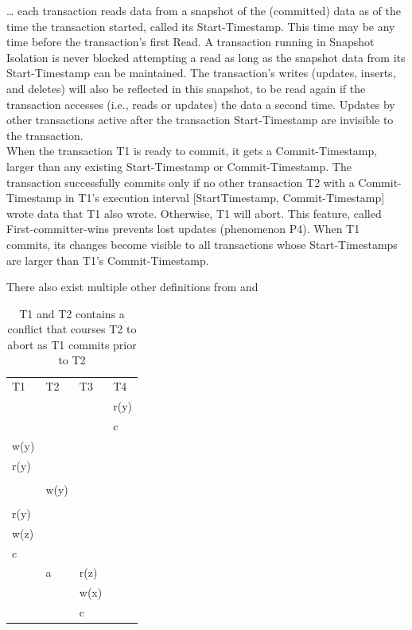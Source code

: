 \documentclass[a4paper,10pt,titlepage]{report}
\begin{document}
\begin{displayquote}
… each transaction reads data from a snapshot of the (committed) data as of the time the transaction started, called its Start-Timestamp. This time may be any time before the transaction's first Read. A transaction running in Snapshot Isolation is never blocked attempting a read as long as the snapshot data from its Start-Timestamp can be maintained. The transaction's writes (updates, inserts, and deletes) will also be reflected in this snapshot, to be read again if the transaction accesses (i.e., reads or updates) the data a second time. Updates by other transactions active after the transaction Start-Timestamp are invisible to the transaction.
\\
When the transaction T1 is ready to commit, it gets a Commit-Timestamp, larger than any existing Start-Timestamp or Commit-Timestamp. The transaction successfully commits only if no other transaction T2 with a Commit-Timestamp in T1's execution interval [StartTimestamp, Commit-Timestamp] wrote data that T1 also wrote. Otherwise, T1 will abort. This feature, called First-committer-wins prevents lost updates (phenomenon P4). When T1 commits, its changes become visible to all transactions whose Start-Timestamps are larger than T1's Commit-Timestamp.
\end{displayquote}


There also exist multiple other definitions from \cite{CeroneBernardiGotsman} and \cite{CrooksPuAlvisiClement}


\begin{table}[h]
    \begin{tabular}{l|l|l|l}
        T1   & T2   & T3   & T4   \\
        &      &      & r(y) \\
        &      &      & c    \\
        w(y) &      &      &      \\
        r(y) &      &      &      \\
        &      &      &      \\
        & w(y) &      &      \\
        &      &      &      \\
        r(y) &      &      &      \\
        w(z) &      &      &      \\
        c    &      &      &      \\
        & a    & r(z) &      \\
        &      & w(x) &      \\
        &      & c    &
    \end{tabular}
    \caption{T1 and T2 contains a conflict that courses T2 to abort as T1 commits prior to T2}
\end{table}
\end{document}
